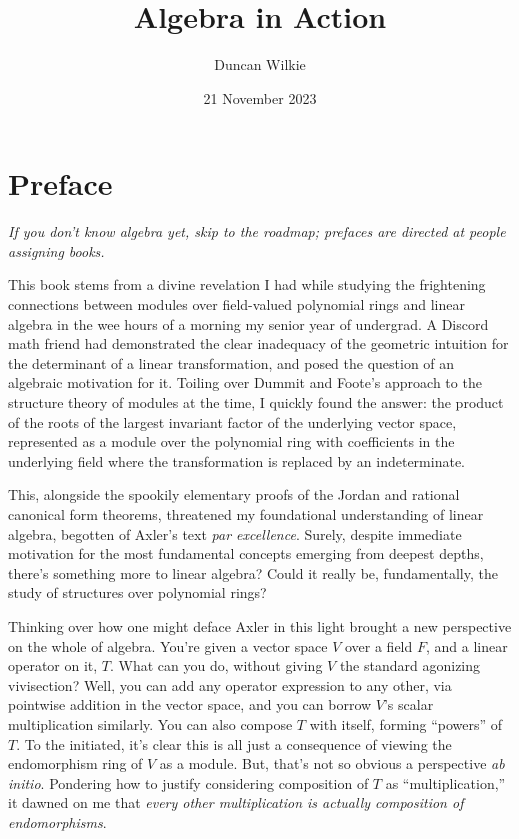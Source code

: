 \documentclass{book}
\title{Algebra in Action}
\author{Duncan Wilkie}
\date{21 November 2023}
\begin{document}
\maketitle

\chapter{Preface}

\textit{If you don't know algebra yet, skip to the roadmap; prefaces are directed at people assigning books.}
\vspace{20pt}

This book stems from a divine revelation I had while studying the frightening connections
between modules over field-valued polynomial rings and linear algebra in the wee hours of a morning my senior year of undergrad.
A Discord math friend had demonstrated the clear inadequacy of the geometric intuition for the determinant of a linear transformation,
and posed the question of an algebraic motivation for it.
Toiling over Dummit and Foote's approach to the structure theory of modules at the time, I quickly found the answer:
the product of the roots of the largest invariant factor of the underlying vector space, represented as a module over the polynomial ring
with coefficients in the underlying field where the transformation is replaced by an indeterminate.

This, alongside the spookily elementary proofs of the Jordan and rational canonical form theorems,
threatened my foundational understanding of linear algebra, begotten of Axler's text \textit{par excellence}.
Surely, despite immediate motivation for the most fundamental concepts emerging from deepest depths, there's something more to linear algebra?
Could it really be, fundamentally, the study of structures over polynomial rings?

Thinking over how one might deface Axler in this light brought a new perspective on the whole of algebra.
You're given a vector space $V$ over a field $F$, and a linear operator on it, $T$.
What can you do, without giving $V$ the standard agonizing vivisection?
Well, you can add any operator expression to any other, via pointwise addition in the vector space,
and you can borrow $V$'s scalar multiplication similarly.
You can also compose $T$ with itself, forming ``powers'' of $T$.
To the initiated, it's clear this is all just a consequence of viewing the endomorphism ring of $V$ as a module.
But, that's not so obvious a perspective \textit{ab initio}.
Pondering how to justify considering composition of $T$ as ``multiplication,'' it dawned on me that
\textit{every other multiplication is actually composition of endomorphisms}.
\end{document}
